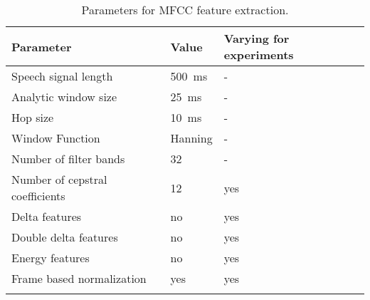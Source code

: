 \begin{table}[ht!]
\begin{center}
\caption{Parameters for MFCC feature extraction.}
\begin{tabular}{ M{6cm}  M{2cm} M{2cm}}
\toprule
\textbf{Parameter} & \textbf{Value} & \textbf{Varying for experiments} \\
\midrule
Speech signal length & \SI{500}{\milli\second} & - \\
Analytic window size & \SI{25}{\milli\second} & -\\
Hop size & \SI{10}{\milli\second} & -\\
Window Function & Hanning & -\\
\midrule
Number of filter bands & 32 & -\\
Number of cepstral coefficients & 12 & yes\\
Delta features & no & yes \\
Double delta features & no & yes \\
Energy features & no 	& yes \\
Frame based normalization & yes & yes\\
\bottomrule
\label{tab:exp_details_params_feature}
\end{tabular}
\end{center}
\end{table}
\FloatBarrier
\noindent